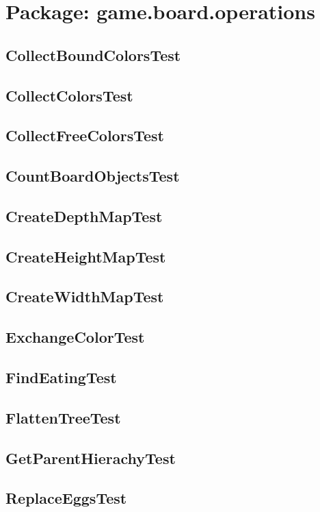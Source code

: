 \section{Package: game.board.operations}
\subsection{CollectBoundColorsTest}
\subsection{CollectColorsTest}
\subsection{CollectFreeColorsTest}
\subsection{CountBoardObjectsTest}
\subsection{CreateDepthMapTest}
\subsection{CreateHeightMapTest}
\subsection{CreateWidthMapTest}
\subsection{ExchangeColorTest}
\subsection{FindEatingTest}
\subsection{FlattenTreeTest}
\subsection{GetParentHierachyTest}
\subsection{ReplaceEggsTest}
